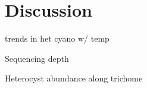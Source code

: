 \section{Discussion}

\cite{Yeager_2012} trends in het cyano w/ temp

Sequencing depth

Heterocyst abundance along trichome